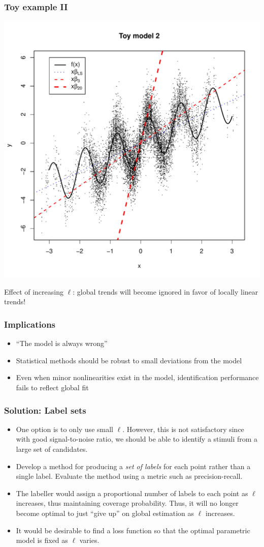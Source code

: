 \documentclass{beamer}
\begin{document}
\begin{frame}
\frametitle{Toy example II}
\begin{center}
\includegraphics[scale = 0.4]{toy2_plot2.pdf}
\end{center}
Effect of increasing $\ell$: global trends will become ignored in
favor of locally linear trends!
\end{frame}

\begin{frame}
\frametitle{Implications}
\begin{itemize}
\item
``The model is always wrong''
\item
Statistical methods should be robust to small deviations from the
model
\item
Even when minor nonlinearities exist in the model, identification
performance fails to reflect global fit
\end{itemize}
\end{frame}

\begin{frame}
\frametitle{Solution: Label sets}
\begin{itemize}
\item
One option is to only use small $\ell$.  However, this is not
satisfactory since with good signal-to-noise ratio, we should be able
to identify a stimuli from a large set of candidates.
\item
Develop a method for producing a \emph{set of labels} for each point
rather than a single label.  Evaluate the method using a metric such
as precision-recall.
\item
The labeller would assign a proportional number of labels to each
point as $\ell$ increases, thus maintaining coverage probability.
Thus, it will no longer become optimal to just ``give up'' on global
estimation as $\ell$ increases.
\item
It would be desirable to find a loss function so that
the optimal parametric model is fixed as $\ell$ varies.
\end{itemize}
\end{frame}
\end{document}
